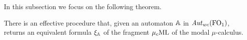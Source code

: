 
%
%

In this subsection we focus on the following theorem.

\begin{theorem}\label{t:autofor}
There is an effective procedure that, given an automaton $\mathbb{A}$ in
$\mathit{Aut}_{wc}(\mathrm{FO}_1)$, returns an equivalent formula $\xi_{\mathbb{A}}$ of the fragment 
$\mu_{c}\mathrm{ML}$ of the modal $\mu$-calculus.
\end{theorem}

